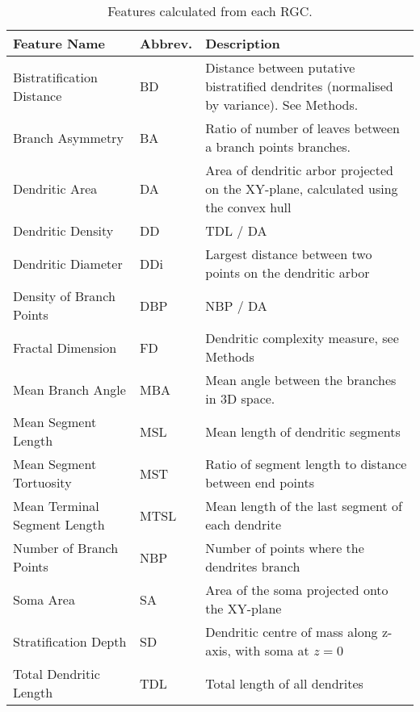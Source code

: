 \documentclass[11pt]{article}
\begin{document}
\clearpage

\singlespacing

\begin{table}
  {\renewcommand{\arraystretch}{1.3} \begin{tabular}{llp{8cm}}
      \toprule
      \textbf{Feature Name} & \textbf{Abbrev.} & \textbf{Description} \\

      \midrule
      Bistratification Distance &  BD & {\footnotesize Distance between putative bistratified dendrites (normalised by variance). See Methods.}\\
      Branch Asymmetry & BA & {\footnotesize Ratio of number of leaves between a branch points branches.}\\
      Dendritic Area & DA & {\footnotesize Area of dendritic arbor projected on the XY-plane, calculated using the convex hull}\\
      Dendritic Density & DD & {\footnotesize TDL / DA}\\
      Dendritic Diameter & DDi & {\footnotesize  Largest distance between two points on the dendritic arbor}\\
      Density of Branch Points & DBP &  {\footnotesize  NBP / DA }\\
      Fractal Dimension & FD & {\footnotesize  Dendritic complexity measure, see Methods}\\
      Mean Branch Angle & MBA &  {\footnotesize  Mean angle between the branches in 3D space.}\\
      Mean Segment Length & MSL & {\footnotesize  Mean length of dendritic segments}\\
      Mean Segment Tortuosity & MST & {\footnotesize  Ratio of segment length to distance between end points}\\
      Mean Terminal Segment Length & MTSL & {\footnotesize  Mean length of the last segment of each dendrite}\\
      Number of Branch Points & NBP &  {\footnotesize  Number of points where the dendrites branch}\\
      Soma Area & SA & {\footnotesize  Area of the soma projected onto the XY-plane}\\
      Stratification Depth & SD & {\footnotesize Dendritic centre of mass along z-axis, with soma at $z=0$}\\
      Total Dendritic Length & TDL & {\footnotesize Total length of all dendrites}\\

  \bottomrule
\end{tabular}
}
\caption{Features calculated from each RGC.}
\label{tab:featurelist}
\end{table}
\end{document}
